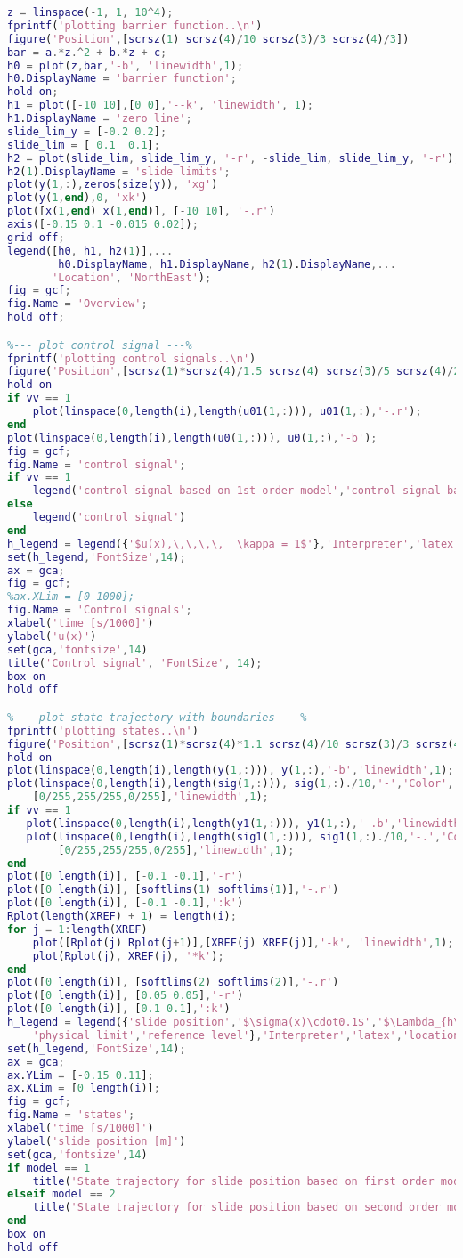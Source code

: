 \begin{lstlisting}[language=matlab]
%--- plot Barrier function ---%
z = linspace(-1, 1, 10^4);
fprintf('plotting barrier function..\n')
figure('Position',[scrsz(1) scrsz(4)/10 scrsz(3)/3 scrsz(4)/3])
bar = a.*z.^2 + b.*z + c;
h0 = plot(z,bar,'-b', 'linewidth',1);
h0.DisplayName = 'barrier function';
hold on;
h1 = plot([-10 10],[0 0],'--k', 'linewidth', 1);
h1.DisplayName = 'zero line';
slide_lim_y = [-0.2 0.2]; 
slide_lim = [ 0.1  0.1];
h2 = plot(slide_lim, slide_lim_y, '-r', -slide_lim, slide_lim_y, '-r');
h2(1).DisplayName = 'slide limits';
plot(y(1,:),zeros(size(y)), 'xg')
plot(y(1,end),0, 'xk')
plot([x(1,end) x(1,end)], [-10 10], '-.r')
axis([-0.15 0.1 -0.015 0.02]);
grid off;
legend([h0, h1, h2(1)],...
        h0.DisplayName, h1.DisplayName, h2(1).DisplayName,...
       'Location', 'NorthEast');
fig = gcf;
fig.Name = 'Overview';
hold off;

%--- plot control signal ---%
fprintf('plotting control signals..\n')
figure('Position',[scrsz(1)*scrsz(4)/1.5 scrsz(4) scrsz(3)/5 scrsz(4)/2.8])
hold on
if vv == 1
    plot(linspace(0,length(i),length(u01(1,:))), u01(1,:),'-.r');
end
plot(linspace(0,length(i),length(u0(1,:))), u0(1,:),'-b');
fig = gcf;
fig.Name = 'control signal';
if vv == 1
    legend('control signal based on 1st order model','control signal based on 2nd order model')
else
    legend('control signal')
end
h_legend = legend({'$u(x),\,\,\,\,  \kappa = 1$'},'Interpreter','latex');
set(h_legend,'FontSize',14);
ax = gca;
fig = gcf;
%ax.XLim = [0 1000];
fig.Name = 'Control signals';
xlabel('time [s/1000]')
ylabel('u(x)')
set(gca,'fontsize',14)
title('Control signal', 'FontSize', 14);
box on
hold off

%--- plot state trajectory with boundaries ---%
fprintf('plotting states..\n')
figure('Position',[scrsz(1)*scrsz(4)*1.1 scrsz(4)/10 scrsz(3)/3 scrsz(4)/3])
hold on
plot(linspace(0,length(i),length(y(1,:))), y(1,:),'-b','linewidth',1);
plot(linspace(0,length(i),length(sig(1,:))), sig(1,:)./10,'-','Color',...
    [0/255,255/255,0/255],'linewidth',1);
if vv == 1
   plot(linspace(0,length(i),length(y1(1,:))), y1(1,:),'-.b','linewidth',1);
   plot(linspace(0,length(i),length(sig1(1,:))), sig1(1,:)./10,'-.','Color',...
        [0/255,255/255,0/255],'linewidth',1);
end
plot([0 length(i)], [-0.1 -0.1],'-r')
plot([0 length(i)], [softlims(1) softlims(1)],'-.r')
plot([0 length(i)], [-0.1 -0.1],':k')
Rplot(length(XREF) + 1) = length(i);
for j = 1:length(XREF)
    plot([Rplot(j) Rplot(j+1)],[XREF(j) XREF(j)],'-k', 'linewidth',1);
    plot(Rplot(j), XREF(j), '*k');
end
plot([0 length(i)], [softlims(2) softlims(2)],'-.r')
plot([0 length(i)], [0.05 0.05],'-r')
plot([0 length(i)], [0.1 0.1],':k')
h_legend = legend({'slide position','$\sigma(x)\cdot0.1$','$\Lambda_{h\pm}$','$\Lambda_{s\pm}$',...
    'physical limit','reference level'},'Interpreter','latex','location','southeast');
set(h_legend,'FontSize',14);
ax = gca;
ax.YLim = [-0.15 0.11];
ax.XLim = [0 length(i)];
fig = gcf;
fig.Name = 'states';
xlabel('time [s/1000]')
ylabel('slide position [m]')
set(gca,'fontsize',14)
if model == 1
    title('State trajectory for slide position based on first order model', 'FontSize', 14);
elseif model == 2
    title('State trajectory for slide position based on second order model', 'FontSize', 14);
end    
box on
hold off


\end{lstlisting}
